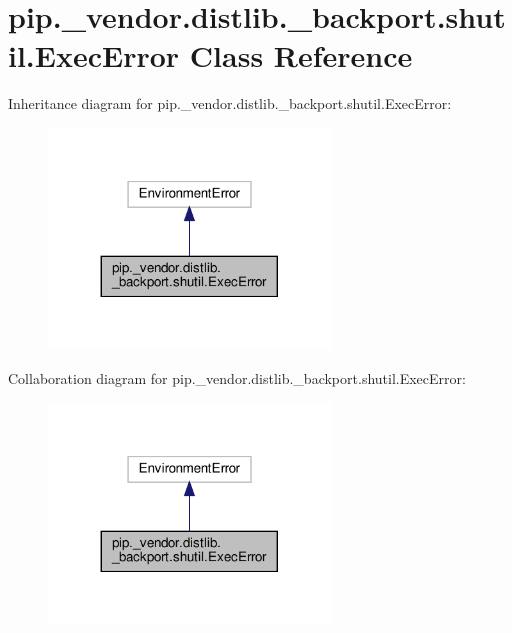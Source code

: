 \hypertarget{classpip_1_1__vendor_1_1distlib_1_1__backport_1_1shutil_1_1ExecError}{}\section{pip.\+\_\+vendor.\+distlib.\+\_\+backport.\+shutil.\+Exec\+Error Class Reference}
\label{classpip_1_1__vendor_1_1distlib_1_1__backport_1_1shutil_1_1ExecError}


Inheritance diagram for pip.\+\_\+vendor.\+distlib.\+\_\+backport.\+shutil.\+Exec\+Error\+:
\nopagebreak
\begin{figure}[H]
\begin{center}
\leavevmode
\includegraphics[width=212pt]{classpip_1_1__vendor_1_1distlib_1_1__backport_1_1shutil_1_1ExecError__inherit__graph}
\end{center}
\end{figure}


Collaboration diagram for pip.\+\_\+vendor.\+distlib.\+\_\+backport.\+shutil.\+Exec\+Error\+:
\nopagebreak
\begin{figure}[H]
\begin{center}
\leavevmode
\includegraphics[width=212pt]{classpip_1_1__vendor_1_1distlib_1_1__backport_1_1shutil_1_1ExecError__coll__graph}
\end{center}
\end{figure}


